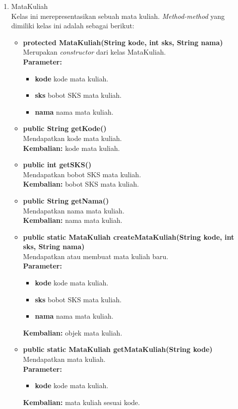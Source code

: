 \begin{enumerate}
\begin{enumerate}
		\item MataKuliah\\
		Kelas ini merepresentasikan sebuah mata kuliah. \textit{Method-method} yang dimiliki kelas ini adalah sebagai berikut:
		\begin{itemize}
			\item \textbf{protected MataKuliah(String kode, int sks, String nama)} \\
			Merupakan \textit{constructor} dari kelas MataKuliah.\\
			\textbf{Parameter:}
			\begin{itemize}
				\item \textbf{kode} kode mata kuliah.
				\item \textbf{sks} bobot SKS mata kuliah.
				\item \textbf{nama} nama mata kuliah.
			\end{itemize}
			
			\item \textbf{public String getKode()}\\
				Mendapatkan kode mata kuliah.\\
				\textbf{Kembalian:} kode mata kuliah.
				
			\item \textbf{public int getSKS()}\\
				Mendapatkan bobot SKS mata kuliah.\\
				\textbf{Kembalian:} bobot SKS mata kuliah.
				
			\item \textbf{public String getNama()}\\
				Mendapatkan nama mata kuliah.\\
				\textbf{Kembalian:} nama mata kuliah.
				
			\item \textbf{public static MataKuliah createMataKuliah(String kode, int sks, String nama)} \\
			Mendapatkan atau membuat mata kuliah baru.\\
			\textbf{Parameter:}
			\begin{itemize}
				\item \textbf{kode} kode mata kuliah.
				\item \textbf{sks} bobot SKS mata kuliah.
				\item \textbf{nama} nama mata kuliah.
			\end{itemize}
			\textbf{Kembalian:} objek mata kuliah.
			
			\item \textbf{public static MataKuliah getMataKuliah(String kode)}\\
				Mendapatkan mata kuliah.\\
				\textbf{Parameter:}
				\begin{itemize}
					\item \textbf{kode} kode mata kuliah.
				\end{itemize}
				\textbf{Kembalian:} mata kuliah sesuai kode.	
		\end{itemize}
		

\end{enumerate}
\end{enumerate}
